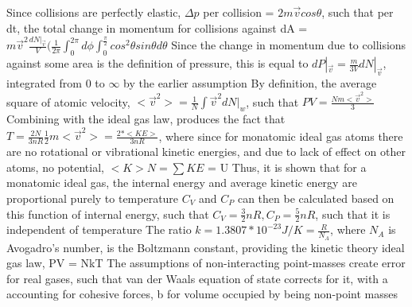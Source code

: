 \documentclass[11 pt, twoside]{article}
\newenvironment{outline*}
{
	\begin{outline}[enumerate]
	}
	{\end{outline}
}
\begin{document}
\begin{outline*}
\1 Since collisions are perfectly elastic, $\Delta p$ per collision = $2m\vec{v}cos\theta$, such that per dt, the total change in momentum for collisions against dA = $m\vec{v}^2\frac{dN|_\vec{v}}{V}(\frac{1}{2\pi}\int^{2\pi}_0 d\phi \int^{\frac{\pi}{2}}_0 cos^2\theta sin\theta d\theta$
\2 Since the change in momentum due to collisions against some area is the definition of pressure, this is equal to $dP|_\vec{v} = \frac{m}{3V}dN|_\vec{v}$, integrated from 0 to $\infty$ by the earlier assumption
\2 By definition, the average square of atomic velocity, $<\vec{v}^2> = \frac{1}{N}\int \vec{v}^2 dN|_w$, such that $PV = \frac{Nm<\vec{v}^2>}{3}$
\2 Combining with the ideal gas law, produces the fact that $T = \frac{2N}{3nR}\frac{1}{2}m<\vec{v}^2> = \frac{2*<KE>}{3nR}$, where since for monatomic ideal gas atoms there are no rotational or vibrational kinetic energies, and due to lack of effect on other atoms, no potential, $<K>N = \sum KE$ = U
\3 Thus, it is shown that for a monatomic ideal gas, the internal energy and average kinetic energy are proportional purely to temperature
\3 $C_V$ and $C_P$ can then be calculated based on this function of internal energy, such that $C_V = \frac{3}{2}nR, C_P = \frac{5}{2}nR$, such that it is independent of temperature
\3 The ratio $k = 1.3807 * 10^{-23} J/K = \frac{R}{N_A}$, where $N_A$ is Avogadro's number, is the Boltzmann constant, providing the kinetic theory ideal gas law, PV = NkT
\1 The assumptions of non-interacting point-masses create error for real gases, such that van der Waals equation of state corrects for it, with a accounting for cohesive forces, b for volume occupied by being non-point masses
\end{outline*}
\end{document}
